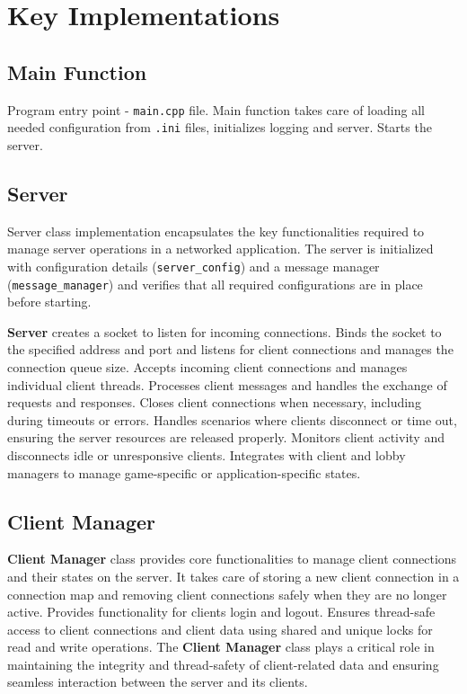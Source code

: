 \documentclass[english, sem, kiv, he, iso690alph, pdf, viewonly]{fasthesis}
\begin{document}
\newpage
\section{Key Implementations}

\subsection{Main Function}
Program entry point - \texttt{main.cpp} file. Main function takes care of loading all needed configuration from \texttt{.ini} files, initializes logging and server. Starts the server.

\subsection{Server}
Server class implementation encapsulates the key functionalities required to manage server operations in a networked application. The server is initialized with configuration details (\texttt{server\_config}) and a message manager (\texttt{message\_manager}) and verifies that all required configurations are in place before starting.

\textbf{Server} creates a socket to listen for incoming connections. Binds the socket to the specified address and port and listens for client connections and manages the connection queue size. Accepts incoming client connections and manages individual client threads. Processes client messages and handles the exchange of requests and responses. Closes client connections when necessary, including during timeouts or errors. Handles scenarios where clients disconnect or time out, ensuring the server resources are released properly. Monitors client activity and disconnects idle or unresponsive clients. Integrates with client and lobby managers to manage game-specific or application-specific states.

\subsection{Client Manager}
\textbf{Client Manager} class provides core functionalities to manage client connections and their states on the server. It takes care of storing a new client connection in a connection map and removing client connections safely when they are no longer active. Provides functionality for clients login and logout. Ensures thread-safe access to client connections and client data using shared and unique locks for read and write operations. The \textbf{Client Manager} class plays a critical role in maintaining the integrity and thread-safety of client-related data and ensuring seamless interaction between the server and its clients.
\end{document}
